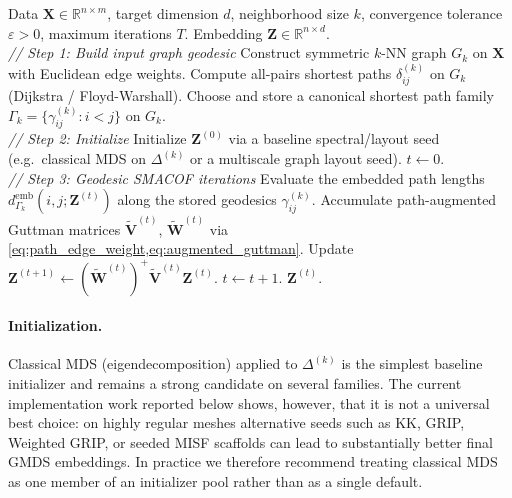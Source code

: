 \documentclass[twoside,11pt]{article}
\newcommand{\R}{\mathbb{R}}
\newcommand{\bX}{\mathbf{X}}
\newcommand{\bZ}{\mathbf{Z}}
\newcommand{\bV}{\mathbf{V}}
\newcommand{\bW}{\mathbf{W}}
\newcommand{\abs}[1]{\left|#1\right|}
\newcommand{\demb}{d^{\mathrm{emb}}}
\newcommand{\Gk}{G_k}
\begin{document}
\begin{algorithm}
\caption{Geodesic MDS}
\label{alg:geodesic_mds}
\begin{algorithmic}[1]
  \REQUIRE Data $\bX \in \R^{n \times m}$, target dimension $d$,
           neighborhood size $k$, convergence tolerance $\varepsilon > 0$,
           maximum iterations $T$.
  \ENSURE Embedding $\bZ \in \R^{n \times d}$.
  \\
  \textit{// Step 1: Build input graph geodesic}
  \STATE Construct symmetric $k$-NN graph $\Gk$ on $\bX$ with Euclidean
         edge weights.
  \STATE Compute all-pairs shortest paths $\delta^{(k)}_{ij}$ on $\Gk$
         (Dijkstra / Floyd-Warshall).
  \STATE Choose and store a canonical shortest path family
         $\Gamma_k = \{\gamma_{ij}^{(k)} : i < j\}$ on $\Gk$.
  \\
  \textit{// Step 2: Initialize}
  \STATE Initialize $\bZ^{(0)}$ via a baseline spectral/layout seed
         (e.g.\ classical MDS on $\Delta^{(k)}$ or a multiscale graph layout seed).
  \STATE $t \leftarrow 0$.
  \\
  \textit{// Step 3: Geodesic SMACOF iterations}
  \REPEAT
    \STATE Evaluate the embedded path lengths
           $\demb_{\Gamma_k}(i,j;\bZ^{(t)})$ along the stored geodesics
           $\gamma_{ij}^{(k)}$.
    \STATE Accumulate path-augmented Guttman matrices
           $\tilde{\bV}^{(t)}$, $\tilde{\bW}^{(t)}$ via \cref{eq:path_edge_weight,eq:augmented_guttman}.
    \STATE Update $\bZ^{(t+1)} \leftarrow (\tilde{\bW}^{(t)})^+ \tilde{\bV}^{(t)} \bZ^{(t)}$.
    \STATE $t \leftarrow t + 1$.
  \UNTIL{$\abs{\sigma^{\mathrm{geo}}(\bZ^{(t)}) - \sigma^{\mathrm{geo}}(\bZ^{(t-1)})} < \varepsilon$
         or $t \geq T$.}
  \RETURN $\bZ^{(t)}$.
\end{algorithmic}
\end{algorithm}

\paragraph{Initialization.}
Classical MDS (eigendecomposition) applied to $\Delta^{(k)}$ is the simplest
baseline initializer and remains a strong candidate on several families.  The
current implementation work reported below shows, however, that it is not a
universal best choice: on highly regular meshes alternative seeds such as KK,
GRIP, Weighted GRIP, or seeded MISF scaffolds can lead to substantially better
final GMDS embeddings.  In practice we therefore recommend treating classical
MDS as one member of an initializer pool rather than as a single default.
\end{document}
